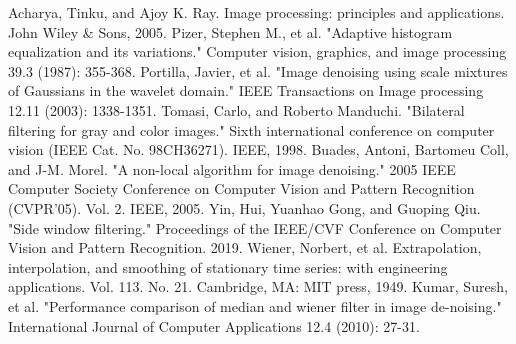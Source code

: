 \documentclass[conference]{IEEEtran}
\begin{document}
\begin{thebibliography}{00}
	 Acharya, Tinku, and Ajoy K. Ray. Image processing: principles and applications. John Wiley \& Sons, 2005.
	 Pizer, Stephen M., et al. "Adaptive histogram equalization and its variations." Computer vision, graphics, and image processing 39.3 (1987): 355-368.
	 Portilla, Javier, et al. "Image denoising using scale mixtures of Gaussians in the wavelet domain." IEEE Transactions on Image processing 12.11 (2003): 1338-1351.
	 Tomasi, Carlo, and Roberto Manduchi. "Bilateral filtering for gray and color images." Sixth international conference on computer vision (IEEE Cat. No. 98CH36271). IEEE, 1998.
	 Buades, Antoni, Bartomeu Coll, and J-M. Morel. "A non-local algorithm for image denoising." 2005 IEEE Computer Society Conference on Computer Vision and Pattern Recognition (CVPR'05). Vol. 2. IEEE, 2005.
	 Yin, Hui, Yuanhao Gong, and Guoping Qiu. "Side window filtering." Proceedings of the IEEE/CVF Conference on Computer Vision and Pattern Recognition. 2019.
	 Wiener, Norbert, et al. Extrapolation, interpolation, and smoothing of stationary time series: with engineering applications. Vol. 113. No. 21. Cambridge, MA: MIT press, 1949.
	 Kumar, Suresh, et al. "Performance comparison of median and wiener filter in image de-noising." International Journal of Computer Applications 12.4 (2010): 27-31.
\end{thebibliography}
\end{document}
